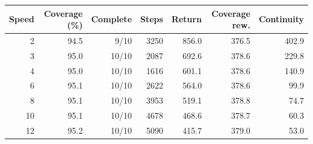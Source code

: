 \begin{tabular}{rrrrrrr}
\toprule
Speed & Coverage (\%) & Complete & Steps & Return & Coverage rew. & Continuity \\
\midrule
2 & 94.5 & 9/10 & 3250 & 856.0 & 376.5 & 402.9 \\
3 & 95.0 & 10/10 & 2087 & 692.6 & 378.6 & 229.8 \\
4 & 95.0 & 10/10 & 1616 & 601.1 & 378.6 & 140.9 \\
6 & 95.1 & 10/10 & 2622 & 564.0 & 378.6 & 99.9 \\
8 & 95.1 & 10/10 & 3953 & 519.1 & 378.8 & 74.7 \\
10 & 95.1 & 10/10 & 4678 & 468.6 & 378.7 & 60.3 \\
12 & 95.2 & 10/10 & 5090 & 415.7 & 379.0 & 53.0 \\
\bottomrule
\end{tabular}